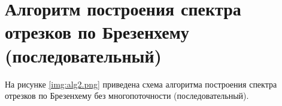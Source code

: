 \section{Алгоритм построения спектра отрезков по Брезенхему (последовательный)}
На рисунке \ref{img:alg2.png} приведена схема алгоритма построения спектра отрезков по Брезенхему без многопоточности (последовательный).
\\
\\
\\
\\
\\
\\
\\
\\
\\
\\
\\
\\
\\
\\
\\
\\
\\
\\
\\
\\
\\
\\
\\
\\
\\
\\
\\
\\



\FloatBarrier
